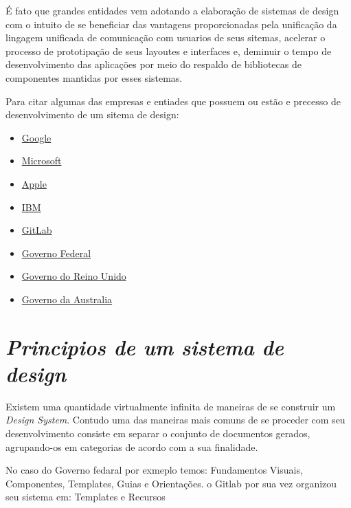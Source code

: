   É fato que grandes entidades vem adotando a elaboração de sistemas de design com o intuito de se beneficiar das vantagens proporcionadas pela unificação da lingagem unificada de comunicação com usuarios de seus sitemas, acelerar o processo de prototipação de seus layoutes e interfaces e, deminuir o tempo de desenvolvimento das aplicações por meio do respaldo de bibliotecas de componentes mantidas por esses sistemas.

  Para citar algumas das empresas e entiades que possuem ou estão e precesso de desenvolvimento de um sitema de design:

\begin{itemize}
  \item \href{https://material.io/design/}{Google}
  \item \href{https://www.microsoft.com/design/fluent/#/}{Microsoft}
  \item \href{https://developer.apple.com/design/}{Apple}
  \item \href{https://www.carbondesignsystem.com/}{IBM}
  \item \href{https://www.figma.com/community/plugin/860845891704482356/GitLab}{GitLab}
  \item \href{https://www.gov.br/governodigital/pt-br/transformacao-digital/ferramentas/design-system}{Governo Federal}
  \item \href{https://www.gov.uk/guidance/government-design-principles}{Governo do Reino Unido }
  \item \href{https://designsystem.gov.au/}{Governo da Australia}
\end{itemize}

\section[\textit{Seção}]{\textit{Principios de um sistema de design}}

  Existem uma quantidade virtualmente infinita de maneiras de se construir um \textit{Design System}. Contudo uma das maneiras mais comuns de se proceder com seu desenvolvimento consiste em separar o conjunto de documentos gerados, agrupando-os em categorias de acordo com a sua finalidade.

  No caso do Governo fedaral por exmeplo temos: Fundamentos Visuais, Componentes, Templates, Guias e Orientações. o Gitlab por sua vez organizou seu sistema em: Templates e Recursos

